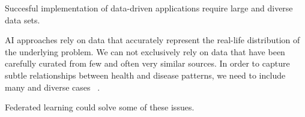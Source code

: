 Succesful implementation of data-driven applications
require large and diverse data sets.

AI approaches rely on data that accurately represent
the real-life distribution of the underlying problem.
We can not exclusively rely on data that have been carefully curated 
from few and often very similar sources. 
In order to capture subtle relationships 
between health and disease patterns,
we need to include many and diverse cases~%
\autocite{riekeFuture2020}.

Federated learning could solve some of these issues\autocite{riekeFuture2020}.




